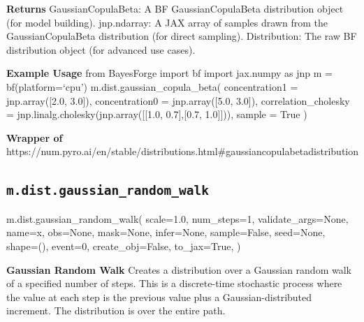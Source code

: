 \documentclass[
  letterpaper,
  DIV=11,
  numbers=noendperiod]{scrartcl}
\newenvironment{Shaded}{\begin{snugshade}}{\end{snugshade}}
\newcommand{\DecValTok}[1]{\textcolor[rgb]{0.68,0.00,0.00}{#1}}
\newcommand{\FloatTok}[1]{\textcolor[rgb]{0.68,0.00,0.00}{#1}}
\newcommand{\NormalTok}[1]{\textcolor[rgb]{0.00,0.23,0.31}{#1}}
\newcommand{\OperatorTok}[1]{\textcolor[rgb]{0.37,0.37,0.37}{#1}}
\newcommand{\StringTok}[1]{\textcolor[rgb]{0.13,0.47,0.30}{#1}}
\newcommand{\VariableTok}[1]{\textcolor[rgb]{0.07,0.07,0.07}{#1}}
\begin{document}
\textbf{Returns} GaussianCopulaBeta: A BF GaussianCopulaBeta
distribution object (for model building). jnp.ndarray: A JAX array of
samples drawn from the GaussianCopulaBeta distribution (for direct
sampling). Distribution: The raw BF distribution object (for advanced
use cases).

\textbf{Example Usage} from BayesForge import bf import jax.numpy as jnp
m = bf(platform=`cpu') m.dist.gaussian\_copula\_beta( concentration1 =
jnp.array({[}2.0, 3.0{]}), concentration0 = jnp.array({[}5.0, 3.0{]}),
correlation\_cholesky = jnp.linalg.cholesky(jnp.array({[}{[}1.0,
0.7{]},{[}0.7, 1.0{]}{]})), sample = True )

\textbf{Wrapper of}
https://num.pyro.ai/en/stable/distributions.html\#gaussiancopulabetadistribution

\subsection{\texorpdfstring{\texttt{m.dist.gaussian\_random\_walk}}{m.dist.gaussian\_random\_walk}}\label{gaussian_random_walk}

\begin{Shaded}
\begin{Highlighting}[]
\NormalTok{m.dist.gaussian\_random\_walk(}
\NormalTok{    scale}\OperatorTok{=}\FloatTok{1.0}\NormalTok{,}
\NormalTok{    num\_steps}\OperatorTok{=}\DecValTok{1}\NormalTok{,}
\NormalTok{    validate\_args}\OperatorTok{=}\VariableTok{None}\NormalTok{,}
\NormalTok{    name}\OperatorTok{=}\StringTok{\textquotesingle{}x\textquotesingle{}}\NormalTok{,}
\NormalTok{    obs}\OperatorTok{=}\VariableTok{None}\NormalTok{,}
\NormalTok{    mask}\OperatorTok{=}\VariableTok{None}\NormalTok{,}
\NormalTok{    infer}\OperatorTok{=}\VariableTok{None}\NormalTok{,}
\NormalTok{    sample}\OperatorTok{=}\VariableTok{False}\NormalTok{,}
\NormalTok{    seed}\OperatorTok{=}\VariableTok{None}\NormalTok{,}
\NormalTok{    shape}\OperatorTok{=}\NormalTok{(),}
\NormalTok{    event}\OperatorTok{=}\DecValTok{0}\NormalTok{,}
\NormalTok{    create\_obj}\OperatorTok{=}\VariableTok{False}\NormalTok{,}
\NormalTok{    to\_jax}\OperatorTok{=}\VariableTok{True}\NormalTok{,}
\NormalTok{)}
\end{Highlighting}
\end{Shaded}

\textbf{Gaussian Random Walk} Creates a distribution over a Gaussian
random walk of a specified number of steps. This is a discrete-time
stochastic process where the value at each step is the previous value
plus a Gaussian-distributed increment. The distribution is over the
entire path.
\end{document}
